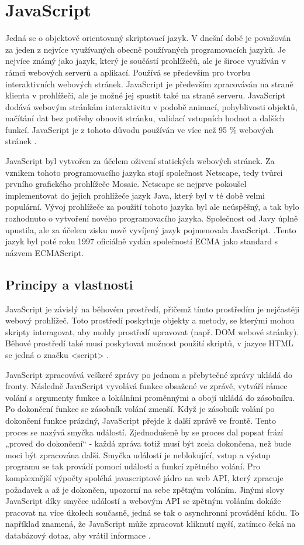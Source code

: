 \chapter{JavaScript}
Jedná se o objektově orientovaný skriptovací jazyk. V dnešní době je považován za jeden z nejvíce využívaných obecně používaných programovacích jazyků. Je nejvíce známý jako jazyk, který je součástí prohlížečů, ale je široce využíván v rámci webových serverů a aplikací\cite{ecmascript}. Používá se především pro tvorbu interaktivních webových stránek. JavaScript je především zpracováván na straně klienta v prohlížeči, ale je možné jej spustit také na straně serveru. JavaScript dodává webovým stránkám interaktivitu v podobě animací, pohyblivosti objektů, načítání dat bez potřeby obnovit stránku, validací vstupních hodnot a dalších funkcí. JavaScript je z tohoto důvodu používán ve více než 95 \% webových stránek \cite{historicaltrends}.

JavaScript byl vytvořen za účelem oživení statických webových stránek. Za vznikem tohoto programovacího jazyka stojí společnost Netscape\cite{ecmascript}, tedy tvůrci prvního grafického prohlížeče Mosaic. Netscape se nejprve pokoušel implementovat do jejich prohlížeče jazyk Java, který byl v té době velmi populární. Vývoj prohlížeče za použití tohoto jazyka byl ale neúspěšný, a tak bylo rozhodnuto o vytvoření nového programovacího jazyka. Společnost od Javy úplně upustila, ale za účelem zisku nově vyvíjený jazyk pojmenovala JavaScript. .Tento jazyk byl poté roku 1997 oficiálně vydán společností ECMA jako standard s názvem ECMAScript\cite{ecmascript}.
    \section{Principy a vlastnosti }
JavaScript je závislý na běhovém prostředí, přičemž tímto prostředím je nejčastěji webový prohlížeč. Toto prostředí poskytuje objekty a metody, se kterými mohou skripty interagovat, aby mohly prostředí upravovat (např. DOM webové stránky). Běhové prostředí také musí poskytovat možnost použití skriptů, v jazyce HTML se jedná o značku <script> \cite{eloquentjava}. 

JavaScript zpracovává veškeré zprávy po jednom a přebytečné zprávy ukládá do fronty. Následně JavaScript vyvolává funkce obsažené ve zprávě, vytváří rámec volání s argumenty funkce a lokálními proměnnými a obojí ukládá do zásobníku. Po dokončení funkce se zásobník volání zmenší. Když je zásobník volání po dokončení funkce prázdný, JavaScript přejde k další zprávě ve frontě. Tento proces se nazývá smyčka událostí. Zjednodušeně by se proces dal popsat frází „proveď do dokončení“ - každá zpráva totiž musí být zcela dokončena, než bude moci být zpracována další. Smyčka událostí je neblokující, vstup a výstup programu se tak provádí pomocí událostí a funkcí zpětného volání. Pro komplexnější výpočty spoléhá javascriptové jádro na web API, který zpracuje požadavek a až je dokončen, upozorní na sebe zpětným voláním. Jinými slovy JavaScript díky smyčce událostí a webovým API se zpětným voláním dokáže pracovat na více úkolech současně, jedná se tak o asynchronní provádění kódu. To například znamená, že JavaScript může zpracovat kliknutí myší, zatímco čeká na databázový dotaz, aby vrátil informace \cite{eloquentjava}.

